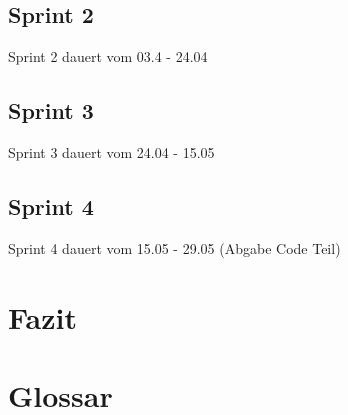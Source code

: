 \documentclass[a4paper,parskip]{scrartcl}
\begin{document}
\subsection{Sprint 2}
Sprint 2 dauert vom 03.4 - 24.04
\subsection{Sprint 3}
Sprint 3 dauert vom 24.04 - 15.05
\subsection{Sprint 4}
Sprint 4 dauert vom 15.05 - 29.05 (Abgabe Code Teil)
\section{Fazit}

\section{Glossar}
\end{document}
